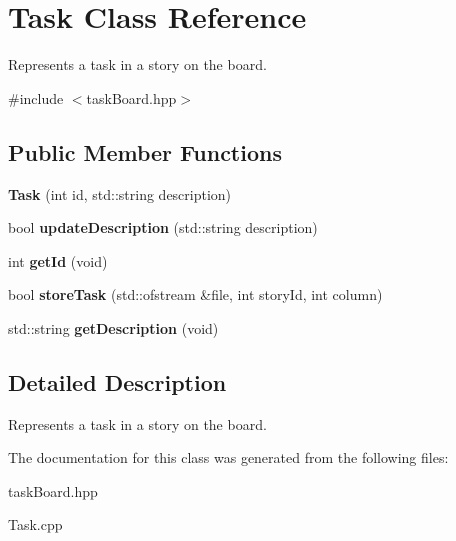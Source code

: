 \hypertarget{classTask}{\section{Task Class Reference}
\label{classTask}
}


Represents a task in a story on the board.  




{\ttfamily \#include $<$task\-Board.\-hpp$>$}

\subsection*{Public Member Functions}
\begin{DoxyCompactItemize}
\item 
\hypertarget{classTask_ac211c367b5b0a0029eaa611a43bc266e}{{\bfseries Task} (int id, std\-::string description)}\label{classTask_ac211c367b5b0a0029eaa611a43bc266e}

\item 
\hypertarget{classTask_a022ea2e13f8fc32a9dc83bbfdac0bfa5}{bool {\bfseries update\-Description} (std\-::string description)}\label{classTask_a022ea2e13f8fc32a9dc83bbfdac0bfa5}

\item 
\hypertarget{classTask_a68bce02d26234d75a7aa4310c30e9975}{int {\bfseries get\-Id} (void)}\label{classTask_a68bce02d26234d75a7aa4310c30e9975}

\item 
\hypertarget{classTask_ad0ca218c52a843d18ef5e515e294df7b}{bool {\bfseries store\-Task} (std\-::ofstream \&file, int story\-Id, int column)}\label{classTask_ad0ca218c52a843d18ef5e515e294df7b}

\item 
\hypertarget{classTask_a5106a001aee22f932126a01caefc3b5a}{std\-::string {\bfseries get\-Description} (void)}\label{classTask_a5106a001aee22f932126a01caefc3b5a}

\end{DoxyCompactItemize}


\subsection{Detailed Description}
Represents a task in a story on the board. 

The documentation for this class was generated from the following files\-:\begin{DoxyCompactItemize}
\item 
task\-Board.\-hpp\item 
Task.\-cpp\end{DoxyCompactItemize}

